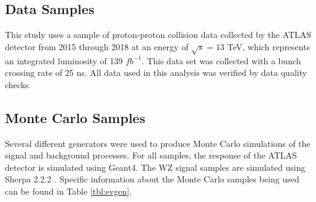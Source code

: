 



\subsection{Data Samples}

This study uses a sample of proton-proton collision data collected by the ATLAS detector from 2015 through 2018 at an energy of $\sqrt{s} = 13$ TeV, which represents an integrated luminosity of 139 $fb^{-1}$. This data set was collected with a bunch crossing rate of 25 ns. All data used in this analysis was verified by data quality checks.

\subsection{Monte Carlo Samples}

Several different generators were used to produce Monte Carlo simulations of the signal and background processes. For all samples, the response of the ATLAS detector is simulated using Geant4. The WZ signal samples are simulated using Sherpa 2.2.2 \cite{sherpa}. Specific information about the Monte Carlo samples being used can be found in Table \ref{tbl:evgen}. 

